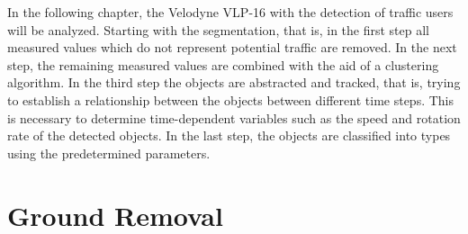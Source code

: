\documentclass[11pt,oneside,openright]{mpreport}
\begin{document}
In the following chapter, the Velodyne VLP-16 with the detection of traffic users will be analyzed. Starting with the segmentation,
that is, in the first step all measured values which do not represent potential traffic are removed. 
In the next step, the remaining measured values are combined with the aid of a clustering algorithm. 
In the third step the objects are abstracted and tracked, that is, trying to establish a relationship between the objects between different time steps.
This is necessary to determine time-dependent variables such as the speed and rotation rate of the detected objects.
In the last step, the objects are classified into types using the predetermined parameters.



\section{Ground Removal}
\end{document}
